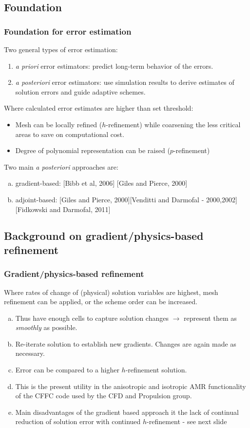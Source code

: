 \documentclass{beamer}
\begin{document}
\subsection{Foundation}
\begin{frame}
\frametitle{Foundation for error estimation}
\scriptsize
Two general types of error estimation:
\begin{enumerate}[1.]
\item \textit{a priori} error estimators:  predict long-term behavior of the errors. 
\item \textit{a posteriori} error estimators: use simulation results to derive estimates of solution errors and guide adaptive schemes.
\end{enumerate}

Where calculated error estimates are higher than set threshold:
\begin{itemize}
\scriptsize
\item Mesh can be locally refined ($h$-refinement) while coarsening the less critical areas to save on computational cost. 
\item Degree of polynomial representation can be raised ($p$-refinement)
\end{itemize}

Two main \textit{a posteriori} approaches are:
\begin{enumerate}[(a)]
\scriptsize
\item gradient-based: [Bibb et al, 2006] [Giles and Pierce, 2000]
\item adjoint-based: [Giles and Pierce, 2000][Venditti and Darmofal - 2000,2002][Fidkowski and Darmofal, 2011] 
\end{enumerate}

\end{frame}


\subsection[Gradient]{Background on gradient/physics-based refinement}
\begin{frame}%
\scriptsize
\frametitle{Gradient/physics-based refinement}
Where rates of change of (physical) solution variables are highest, mesh refinement can be applied, or the scheme order can be increased.

\begin{enumerate}[(a)]
\item Thus have enough cells to capture solution changes $\rightarrow$ represent them as \textit{smoothly} as possible.
\item Re-iterate solution to establish new gradients. Changes are again made as necessary. 
\item Error can be compared to a higher $h$-refinement solution.
\item This is the present utility in the anisotropic and isotropic AMR functionality of the CFFC code used by the CFD and Propulsion group.
\item Main disadvantages of the gradient based approach it the lack of continual reduction of solution error with continued $h$-refinement - see next slide
\end{enumerate}
\end{frame}
\end{document}

